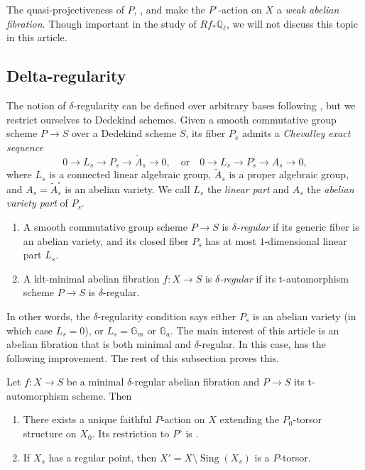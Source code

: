 \documentclass[reqno, letterpaper]{amsart}
\numberwithin{equation}{subsection}
\let\to\longrightarrow
\newcommand{\GG}{\mathbb{G}}
\newcommand{\QQ}{\mathbb{Q}}
\DeclareMathOperator{\Sing}{Sing}
\begin{document}
		\begin{remark}
			The quasi-projectiveness of $P$, , and \cite[Theorem~1.2]{anc-fra24} make the $P^\circ$-action on $X$ a \emph{weak abelian fibration}. Though important in the study of $Rf_*\QQ_\ell$, we will not discuss this topic in this article.
		\end{remark}
		
		
		
	\subsection{Delta-regularity}
		The notion of $\delta$-regularity can be defined over arbitrary bases following \cite[(7.1.5)]{ngo10}, but we restrict ourselves to Dedekind schemes. Given a smooth commutative group scheme $P \to S$ over a Dedekind scheme $S$, its fiber $P_s$ admits a \emph{Chevalley exact sequence} \cite[Theorem~4.2]{brion15}
		\[ 0 \to L_s \to P_s \to \tilde A_s \to 0 , \quad\mbox{or}\quad 0 \to L_s \to P^\circ_s \to A_s \to 0 ,\]
		where $L_s$ is a connected linear algebraic group, $\tilde A_s$ is a proper algebraic group, and $A_s = \tilde A_s^\circ$ is an abelian variety. We call $L_s$ the \emph{linear part} and $A_s$ the \emph{abelian variety part} of $P_s$.
		
		\begin{definition} \label{def:delta-regular}
			\begin{enumerate}
				\item A smooth commutative group scheme $P \to S$ is \emph{$\delta$-regular} if its generic fiber is an abelian variety, and its closed fiber $P_s$ has at most $1$-dimensional linear part $L_s$.
				\item A klt-minimal abelian fibration $f : X \to S$ is \emph{$\delta$-regular} if its t-automorphism scheme $P \to S$ is $\delta$-regular.
			\end{enumerate}
		\end{definition}
		
		In other words, the $\delta$-regularity condition says either $P_s$ is an abelian variety (in which case $L_s = 0$), or $L_s = \GG_m$ or $\GG_a$. The main interest of this article is an abelian fibration that is both minimal and $\delta$-regular. In this case,  has the following improvement. The rest of this subsection proves this.
		
		\begin{proposition} \label{prop:P-action existence}
			Let $f : X \to S$ be a minimal $\delta$-regular abelian fibration and $P \to S$ its t-automorphism scheme. Then
			\begin{enumerate}
				\item There exists a unique faithful $P$-action on $X$ extending the $P_0$-torsor structure on $X_0$. Its restriction to $P^\circ$ is .
				\item If $X_s$ has a regular point, then $X' = X \setminus \Sing(X_s)$ is a $P$-torsor.
			\end{enumerate}
		\end{proposition}
		
\end{document}
